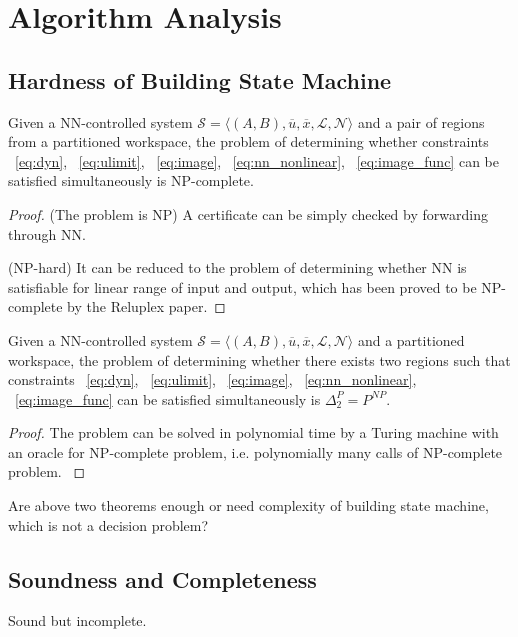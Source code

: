 \section{Algorithm Analysis}

\subsection{Hardness of Building State Machine}

\begin{theorem}
    Given a NN-controlled system 
    $\mathcal{S} = \langle (A, B), \overline{u}, \overline{x}, \mathcal{L}, \mathcal{N} \rangle$ 
    and a pair of regions from a partitioned workspace, 
    the problem of determining whether constraints
    ~\eqref{eq:dyn}, ~\eqref{eq:ulimit}, ~\eqref{eq:image}, ~\eqref{eq:nn_nonlinear}, ~\eqref{eq:image_func}
    can be satisfied simultaneously is NP-complete.
\end{theorem}    

\begin{proof}
    {\color{blue} 
    (The problem is NP) A certificate can be simply checked by forwarding through NN.

    (NP-hard) It can be reduced to the problem of determining whether NN is satisfiable for linear range of input and output, 
    which has been proved to be NP-complete by the Reluplex paper.
    }
\end{proof}


\begin{theorem}
    Given a NN-controlled system 
    $\mathcal{S} = \langle (A, B), \overline{u}, \overline{x}, \mathcal{L}, \mathcal{N} \rangle$ 
    and a partitioned workspace,
    the problem of determining whether there exists two regions such that constraints
    ~\eqref{eq:dyn}, ~\eqref{eq:ulimit}, ~\eqref{eq:image}, ~\eqref{eq:nn_nonlinear}, ~\eqref{eq:image_func}
    can be satisfied simultaneously is $\Delta_2^P = P^{NP}$.
\end{theorem}    

\begin{proof}
    {\color{blue} 
    The problem can be solved in polynomial time by a Turing machine with an oracle for NP-complete problem, 
    i.e. polynomially many calls of NP-complete problem.
    }
\end{proof}    



{\color{blue} Are above two theorems enough or need complexity of building state machine, which is not a decision problem?}


\subsection{Soundness and Completeness}
{\color{blue} Sound but incomplete.}

